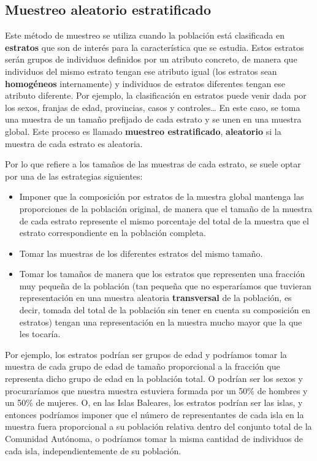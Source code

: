 \documentclass[
  spanish,
  letterpaper,
  DIV=11,
  numbers=noendperiod]{scrreprt}
\begin{document}
\subsection{Muestreo aleatorio
estratificado}\label{muestreo-aleatorio-estratificado}

Este método de muestreo se utiliza cuando la población está clasificada
en \textbf{estratos} que son de interés para la característica que se
estudia. Estos estratos serán grupos de individuos definidos por un
atributo concreto, de manera que individuos del mismo estrato tengan ese
atributo igual (los estratos sean \textbf{homogéneos} internamente) y
individuos de estratos diferentes tengan ese atributo diferente. Por
ejemplo, la clasificación en estratos puede venir dada por los sexos,
franjas de edad, provincias, casos y controles\ldots{} En este caso, se
toma una muestra de un tamaño prefijado de cada estrato y se unen en una
muestra global. Este proceso es llamado \textbf{muestreo estratificado},
\textbf{aleatorio} si la muestra de cada estrato es aleatoria.

Por lo que refiere a los tamaños de las muestras de cada estrato, se
suele optar por una de las estrategias siguientes:

\begin{itemize}
\item
  Imponer que la composición por estratos de la muestra global mantenga
  las proporciones de la población original, de manera que el tamaño de
  la muestra de cada estrato represente el mismo porcentaje del total de
  la muestra que el estrato correspondiente en la población completa.
\item
  Tomar las muestras de los diferentes estratos del mismo tamaño.
\item
  Tomar los tamaños de manera que los estratos que representen una
  fracción muy pequeña de la población (tan pequeña que no esperaríamos
  que tuvieran representación en una muestra aleatoria
  \textbf{transversal} de la población, es decir, tomada del total de la
  población sin tener en cuenta su composición en estratos) tengan una
  representación en la muestra mucho mayor que la que les tocaría.
\end{itemize}

Por ejemplo, los estratos podrían ser grupos de edad y podríamos tomar
la muestra de cada grupo de edad de tamaño proporcional a la fracción
que representa dicho grupo de edad en la población total. O podrían ser
los sexos y procuraríamos que nuestra muestra estuviera formada por un
50\% de hombres y un 50\% de mujeres. O, en las Islas Baleares, los
estratos podrían ser las islas, y entonces podríamos imponer que el
número de representantes de cada isla en la muestra fuera proporcional a
su población relativa dentro del conjunto total de la Comunidad
Autónoma, o podríamos tomar la misma cantidad de individuos de cada
isla, independientemente de su población.
\end{document}
